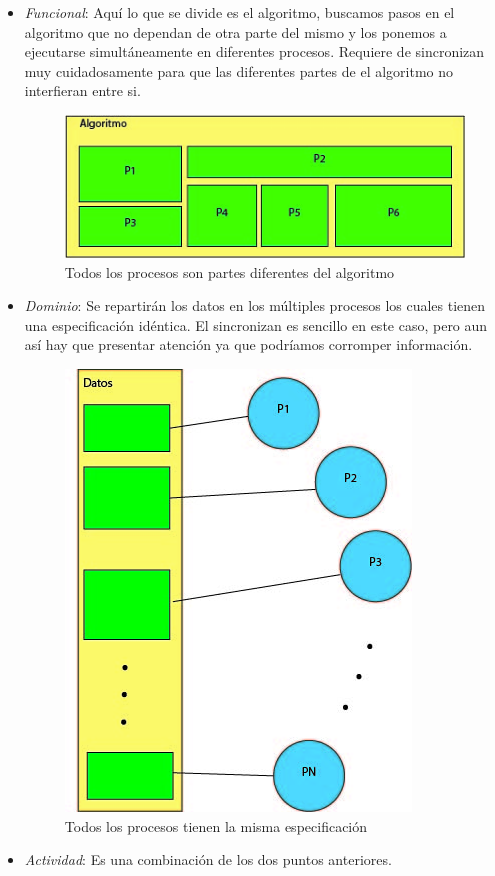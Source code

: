 \begin{itemize}
 
	\item \textit{Funcional}: Aquí lo que se divide es el algoritmo, buscamos pasos en el algoritmo que no dependan de otra parte del mismo y los ponemos a ejecutarse simultáneamente en diferentes 		procesos. Requiere de sincronizan muy cuidadosamente para que las diferentes partes de el algoritmo no interfieran entre si. 
	
	\begin{figure}[h]
			\centering
				\includegraphics[scale=0.7]{img/funcional.jpg}
			\caption{Todos los procesos son partes diferentes del algoritmo}
	\end{figure}

	\item \textit{Dominio}: Se repartirán los datos en los múltiples procesos los cuales tienen una especificación idéntica. El sincronizan es sencillo en este caso, pero aun así hay que presentar atención ya que podríamos corromper información.
	\begin{figure}[h]
			\centering
				\includegraphics[scale=0.6]{img/dominio.jpg}
			\caption{Todos los procesos tienen la misma especificación }
	\end{figure}

	\item 	\textit{Actividad}: Es una combinación de los dos puntos anteriores.
\end{itemize}

